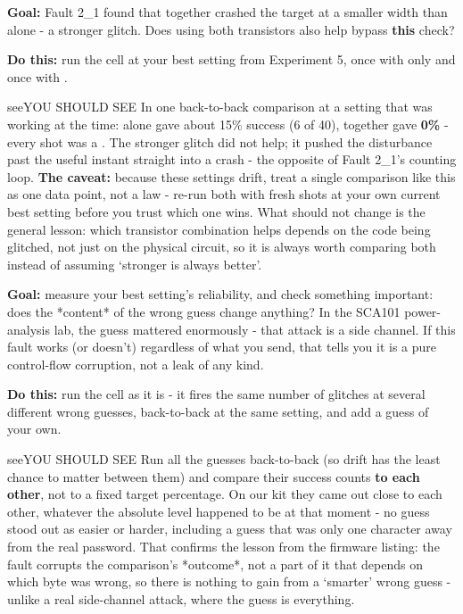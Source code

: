 \documentclass[11pt,letterpaper]{article}
\begin{document}

\textbf{Goal:} Fault 2\_1 found that  together crashed the target at a smaller width than 
alone - a stronger glitch. Does using both transistors also help bypass \textbf{this} check?

\textbf{Do this:} run the cell at your best setting from Experiment 5, once with  only and once with .

\begin{guidecallout}{see}{YOU SHOULD SEE}
In one back-to-back comparison at a setting that was working at the time:  alone gave about 15\% success (6
of 40),  together gave \textbf{0\%} - every shot was a . The stronger glitch did not help;
it pushed the disturbance past the useful instant straight into a crash - the opposite of Fault 2\_1's counting loop.
\textbf{The caveat:} because these settings drift, treat a single comparison like this as one data point, not a law -
re-run both with fresh shots at your own current best setting before you trust which one wins. What should not change
is the general lesson: which transistor combination helps depends on the code being glitched, not just on the physical
circuit, so it is always worth comparing both instead of assuming `stronger is always better'.
\end{guidecallout}


\textbf{Goal:} measure your best setting's reliability, and check something important: does the *content* of the wrong
guess change anything? In the SCA101 power-analysis lab, the guess mattered enormously - that attack is a side
channel. If this fault works (or doesn't) regardless of what you send, that tells you it is a pure control-flow
corruption, not a leak of any kind.

\textbf{Do this:} run the cell as it is - it fires the same number of glitches at several different wrong guesses,
back-to-back at the same setting, and add a guess of your own.

\begin{guidecallout}{see}{YOU SHOULD SEE}
Run all the guesses back-to-back (so drift has the least chance to matter between them) and compare their success
counts \textbf{to each other}, not to a fixed target percentage. On our kit they came out close to each other,
whatever the absolute level happened to be at that moment - no guess stood out as easier or harder, including a guess
that was only one character away from the real password. That confirms the lesson from the firmware listing: the fault
corrupts the comparison's *outcome*, not a part of it that depends on which byte was wrong, so there is nothing to
gain from a `smarter' wrong guess - unlike a real side-channel attack, where the guess is everything.
\end{guidecallout}
\end{document}
